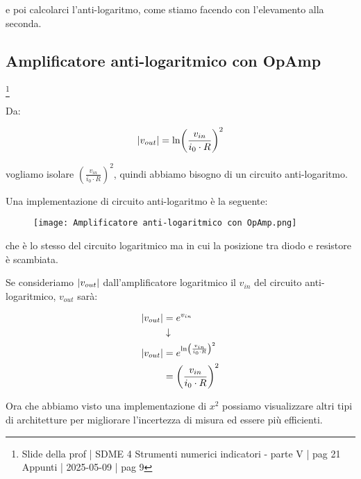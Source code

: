 e poi calcolarci l'anti-logaritmo, come stiamo facendo con l'elevamento alla seconda. \newline 

\newpage 

\subsection{Amplificatore anti-logaritmico con OpAmp}
\footnote{Slide della prof | SDME 4 Strumenti numerici indicatori - parte V | pag 21\\  
Appunti | 2025-05-09 | pag 9}

Da: 

{
    \Large 
    \begin{equation}
        \abs{v_{out}}
        = 
        \ln(\frac{v_{in}}{i_0 \cdot R})^{2}
    \end{equation}
}

vogliamo isolare $(\frac{v_{in}}{i_0 \cdot R})^{2}$, 
quindi abbiamo bisogno di un circuito anti-logaritmo. \newline 

Una implementazione di circuito anti-logaritmo è la seguente: 

\begin{figure}[h]
    \centering
    \texttt{[image: Amplificatore anti-logaritmico con OpAmp.png]}
\end{figure}

che è lo stesso del circuito logaritmico ma in cui la posizione tra diodo e resistore è scambiata. \newline 

Se consideriamo $\abs{v_{out}}$ dall'amplificatore logaritmico il $v_{in}$ del circuito anti-logaritmico, 
$v_{out}$ sarà: 

{
    \Large 
    \begin{equation}
        \begin{split}
            \abs{v_{out}}
            &= 
            e^{v_{in}}
            \\
            &\downarrow
            \\
            \abs{v_{out}}
            &= 
            e^{\ln(\frac{v_{in}}{i_0 \cdot R})^{2}}
            \\ 
            &= 
            \left(\frac{v_{in}}{i_0 \cdot R}\right)^{2}
        \end{split}
    \end{equation}
}   

Ora che abbiamo visto una implementazione di $x^{2}$ possiamo visualizzare altri tipi di architetture per migliorare l'incertezza di misura ed essere più efficienti. \newline 

